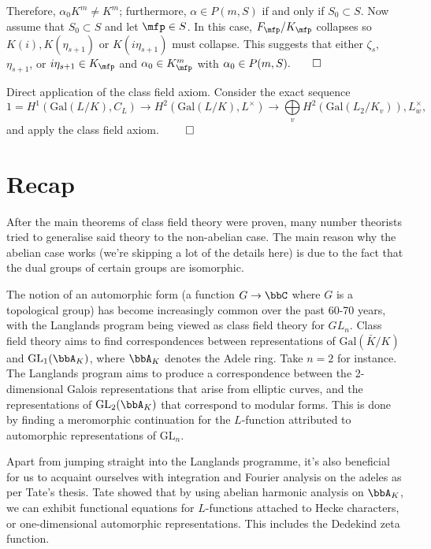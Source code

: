 \documentclass[a4paper, 12pt,oneside,openany]{book}
\begin{document}
Therefore, $\alpha_0 K^m \neq K^m$; furthermore, $\alpha \in P(m, S)$ if and only if $S_0 \subset S$. Now assume that $S_0 \subset S$ and let $\mfp \in S$. In this case, $F_\mfp/K_\mfp$ collapses so $K(i), K(\eta_{s+1})$ or $K(i\eta_{s+1})$ must collapse. This suggests that either $\zeta_s$, $\eta_{s+1}$, or $i\eta_{s+1} \in K_\mfp$ and $\alpha_0 \in K_\mfp^m$ with $\alpha_0 \in P(m, S). \qed$


 Direct application of the class field axiom. Consider the exact sequence $$1= H^1(\text{Gal}(L/K), C_L) \to H^2(\text{Gal}(L/K), L^\times) \to \bigoplus\limits_v H^2(\text{Gal}(L_2/K_v)), L_w^\times,$$ and apply the class field axiom. $\qed$

\section{Recap}
After the main theorems of class field theory were proven, many number theorists tried to generalise said theory to the non-abelian case. The main reason why the abelian case works (we're skipping a lot of the details here) is due to the fact that the dual groups of certain groups are isomorphic. 

The notion of an automorphic form (a function $G \to \bbC$ where $G$ is a topological group) has become increasingly common over the past 60-70 years, with the Langlands program being viewed as class field theory for $GL_n$. Class field theory aims to find correspondences between representations of $\text{Gal}(\bar{K}/K)$ and $\text{GL}_1(\bbA_K)$, where $\bbA_K$ denotes the Adele ring. Take $n=2$ for instance. The Langlands program aims to produce a correspondence between the 2-dimensional Galois representations that arise from elliptic curves, and the representations of $\text{GL}_2(\bbA_K)$ that correspond to modular forms. This is done by finding a meromorphic continuation for the $L$-function attributed to automorphic representations of $\text{GL}_n$. 

Apart from jumping straight into the Langlands programme, it's also beneficial for us to acquaint ourselves with integration and Fourier analysis on the adeles as per Tate's thesis. Tate showed that by using abelian harmonic analysis on $\bbA_K$, we can exhibit functional equations for $L$-functions attached to Hecke characters, or one-dimensional automorphic representations. This includes the Dedekind zeta function. 
\end{document}
